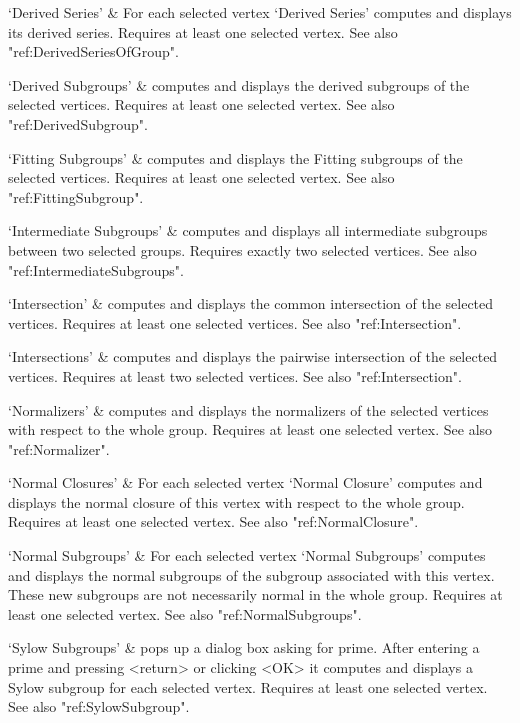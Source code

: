 `Derived Series' &
For   each  selected vertex  `Derived  Series'  computes and displays its
derived series.   Requires  at   least  one selected vertex.    See  also
"ref:DerivedSeriesOfGroup".

`Derived Subgroups' &
computes and  displays the  derived  subgroups of the selected  vertices.
Requires at least one selected vertex.  See also "ref:DerivedSubgroup".

`Fitting Subgroups' &
computes and   displays   the   Fitting   subgroups   of   the   selected
vertices.  Requires    at   least one      selected  vertex.   See   also
"ref:FittingSubgroup".

`Intermediate Subgroups' &
computes and displays all intermediate subgroups between two selected
groups. Requires exactly two selected vertices. See also
"ref:IntermediateSubgroups". 

`Intersection' &
computes and  displays the common intersection  of the selected vertices.
Requires at least one selected vertices.  See also "ref:Intersection".

`Intersections' &
computes and displays the pairwise intersection of the selected vertices.
Requires at least two selected vertices.  See also "ref:Intersection".

`Normalizers' &
computes   and displays  the normalizers   of  the selected vertices with
respect to the whole group.  Requires at least  one selected vertex.  See
also "ref:Normalizer".

`Normal Closures' &
For   each  selected vertex `Normal  Closure'  computes  and displays the
normal closure of this vertex with respect  to the whole group.  Requires
at least one selected vertex.  See also "ref:NormalClosure".

`Normal Subgroups' &
For   each selected vertex `Normal  Subgroups'  computes and displays the
normal subgroups of the subgroup associated  with this vertex.  These new
subgroups are not  necessarily  normal in the  whole  group.  Requires at
least one selected vertex.  See also "ref:NormalSubgroups".

`Sylow Subgroups' &
pops  up a dialog  box asking   for prime.   After entering  a  prime and
pressing  <return> or  clicking  <OK> it computes   and displays  a Sylow
subgroup  for   each selected vertex.  Requires   at   least one selected
vertex.  See also "ref:SylowSubgroup".
\enditems


